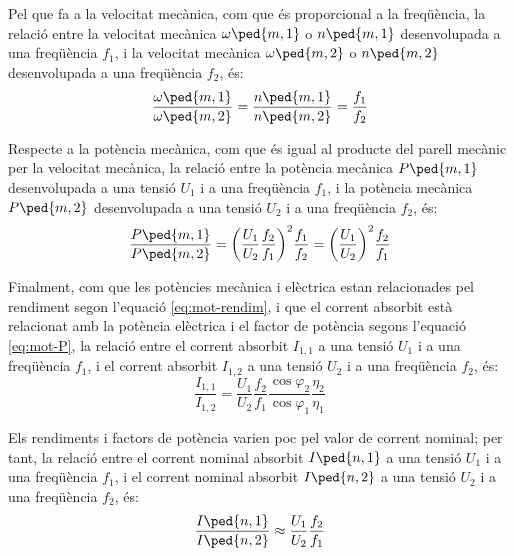 Pel que fa a la velocitat mecànica, com que és proporcional a la freqüència, la relació entre la velocitat mecànica $\omega\ped{m,1}$ o $n\ped{m,1}$ desenvolupada a una freqüència $f_1$, i la velocitat mecànica $\omega\ped{m,2}$ o $n\ped{m,2}$ desenvolupada a una freqüència $f_2$, és:
\begin{equation}\label{eq:nm_U_f}
	\frac{\omega\ped{m,1}}{\omega\ped{m,2}} = \frac{n\ped{m,1}}{n\ped{m,2}} = \frac{f_1}{f_2}
\end{equation}

Respecte a la  potència mecànica, com que  és igual al producte del parell mecànic per la velocitat mecànica, la relació entre la potència mecànica $P\ped{m,1}$ desenvolupada a una tensió $U_1$ i a una freqüència $f_1$, i la potència mecànica $P\ped{m,2}$ desenvolupada a una tensió $U_2$ i a una freqüència $f_2$, és:
\begin{equation}\label{eq:Pm_U_f}
	\frac{P\ped{m,1}}{P\ped{m,2}} =
	{\left(\frac{{U}_{1}}{{U}_{2}}\frac{{f}_{2}}{{f}_{1}}\right)}^2
	\frac{f_1}{f_2} = 	
	 {\left(\frac{{U}_{1}}{{U}_{2}}\right)}^{2} \frac{{f}_{2}}{{f}_{1}}
\end{equation}

Finalment, com que les potències mecànica i elèctrica estan relacionades pel rendiment segon l'equació \eqref{eq:mot-rendim}, i que el corrent absorbit està relacionat amb la potència elèctrica i el factor de potència segons l'equació \eqref{eq:mot-P}, la relació entre el corrent absorbit $I_{1,1}$  a una tensió $U_1$ i a una freqüència $f_1$, i el corrent absorbit $I_{1,2}$ a una tensió $U_2$ i a una freqüència $f_2$, és:
\begin{equation}
	\frac{I_{1,1}}{I_{1,2}} =
	\frac{U_1}{U_2} \frac{f_2}{f_1} \frac{\cos\varphi_2}{\cos\varphi_1} \frac{\eta_2}{\eta_1}
\end{equation}

Els rendiments i factors de potència varien poc pel valor de corrent nominal; per tant,  la relació entre el corrent nominal absorbit $I\ped{n,1}$  a una tensió $U_1$ i a una freqüència $f_1$, i el corrent nominal absorbit $I\ped{n,2}$ a una tensió $U_2$ i a una freqüència $f_2$, és:
\begin{equation}\label{eq:In_U_f}
	\frac{I\ped{n,1}}{I\ped{n,2}} \approx
	\frac{U_1}{U_2} \frac{f_2}{f_1}
\end{equation}


